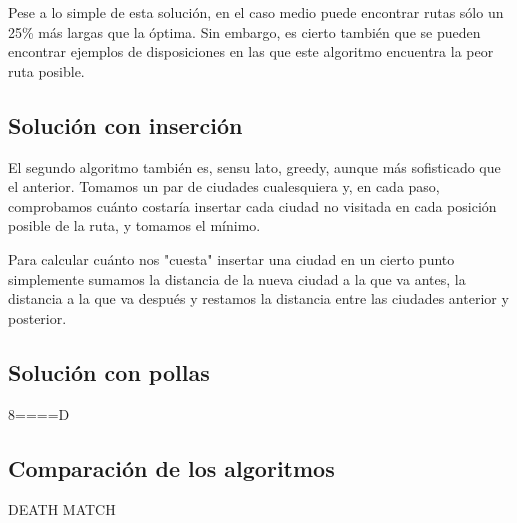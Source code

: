\documentclass[a4paper, 11pt]{article}
\begin{document}
Pese a lo simple de esta solución, en el caso medio puede encontrar rutas sólo un 25\% más largas que la óptima. Sin embargo, es cierto también que se pueden encontrar ejemplos de disposiciones en las que este algoritmo encuentra la peor ruta posible.

\subsection{Solución con inserción}
El segundo algoritmo también es, sensu lato, greedy, aunque más sofisticado que el anterior. Tomamos un par de ciudades cualesquiera y, en cada paso, comprobamos cuánto costaría insertar cada ciudad no visitada en cada posición posible de la ruta, y tomamos el mínimo. 

Para calcular cuánto nos "cuesta" insertar una ciudad en un cierto punto simplemente sumamos la distancia de la nueva ciudad a la que va antes, la distancia a la que va después y restamos la distancia entre las ciudades anterior y posterior.

\subsection{Solución con pollas}
8====D

\subsection{Comparación de los algoritmos}

DEATH MATCH
\end{document}
